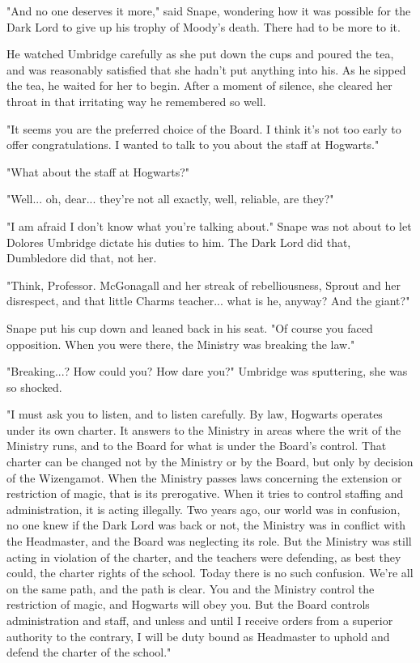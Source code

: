 "And no one deserves it more," said Snape, wondering how it was possible for the Dark Lord to give up his trophy of Moody's death. There had to be more to it.

He watched Umbridge carefully as she put down the cups and poured the tea, and was reasonably satisfied that she hadn't put anything into his. As he sipped the tea, he waited for her to begin. After a moment of silence, she cleared her throat in that irritating way he remembered so well.

"It seems you are the preferred choice of the Board. I think it's not too early to offer congratulations. I wanted to talk to you about the staff at Hogwarts."

"What about the staff at Hogwarts?"

"Well... oh, dear... they're not all exactly, well, reliable, are they?"

"I am afraid I don't know what you're talking about." Snape was not about to let Dolores Umbridge dictate his duties to him. The Dark Lord did that, Dumbledore did that, not her.

"Think, Professor. McGonagall and her streak of rebelliousness, Sprout and her disrespect, and that little Charms teacher... what is he, anyway? And the giant?"

Snape put his cup down and leaned back in his seat. "Of course you faced opposition. When you were there, the Ministry was breaking the law."

"Breaking...? How could you? How dare you?" Umbridge was sputtering, she was so shocked.

"I must ask you to listen, and to listen carefully. By law, Hogwarts operates under its own charter. It answers to the Ministry in areas where the writ of the Ministry runs, and to the Board for what is under the Board's control. That charter can be changed not by the Ministry or by the Board, but only by decision of the Wizengamot. When the Ministry passes laws concerning the extension or restriction of magic, that is its prerogative. When it tries to control staffing and administration, it is acting illegally. Two years ago, our world was in confusion, no one knew if the Dark Lord was back or not, the Ministry was in conflict with the Headmaster, and the Board was neglecting its role. But the Ministry was still acting in violation of the charter, and the teachers were defending, as best they could, the charter rights of the school. Today there is no such confusion. We're all on the same path, and the path is clear. You and the Ministry control the restriction of magic, and Hogwarts will obey you. But the Board controls administration and staff, and unless and until I receive orders from a superior authority to the contrary, I will be duty bound as Headmaster to uphold and defend the charter of the school."


